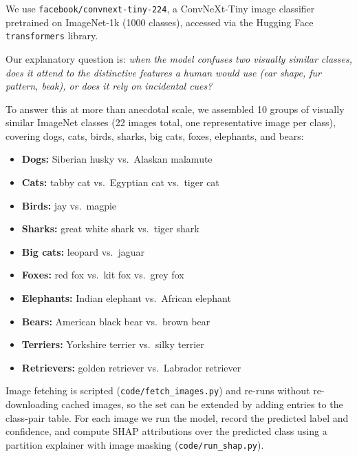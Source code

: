 We use \texttt{facebook/convnext-tiny-224}, a ConvNeXt-Tiny image classifier
pretrained on ImageNet-1k (1000 classes), accessed via the Hugging Face
\texttt{transformers} library.

Our explanatory question is: \emph{when the model confuses two visually
similar classes, does it attend to the distinctive features a human would use
(ear shape, fur pattern, beak), or does it rely on incidental cues?}

To answer this at more than anecdotal scale, we assembled 10 groups of
visually similar ImageNet classes (22 images total, one representative image
per class), covering dogs, cats, birds, sharks, big cats, foxes, elephants,
and bears:

\begin{itemize}
  \item \textbf{Dogs:} Siberian husky vs.\ Alaskan malamute
  \item \textbf{Cats:} tabby cat vs.\ Egyptian cat vs.\ tiger cat
  \item \textbf{Birds:} jay vs.\ magpie
  \item \textbf{Sharks:} great white shark vs.\ tiger shark
  \item \textbf{Big cats:} leopard vs.\ jaguar
  \item \textbf{Foxes:} red fox vs.\ kit fox vs.\ grey fox
  \item \textbf{Elephants:} Indian elephant vs.\ African elephant
  \item \textbf{Bears:} American black bear vs.\ brown bear
  \item \textbf{Terriers:} Yorkshire terrier vs.\ silky terrier
  \item \textbf{Retrievers:} golden retriever vs.\ Labrador retriever
\end{itemize}

Image fetching is scripted (\texttt{code/fetch\_images.py}) and re-runs
without re-downloading cached images, so the set can be extended by adding
entries to the class-pair table. For each image we run the model, record the
predicted label and confidence, and compute SHAP attributions over the
predicted class using a partition explainer with image masking
(\texttt{code/run\_shap.py}).
